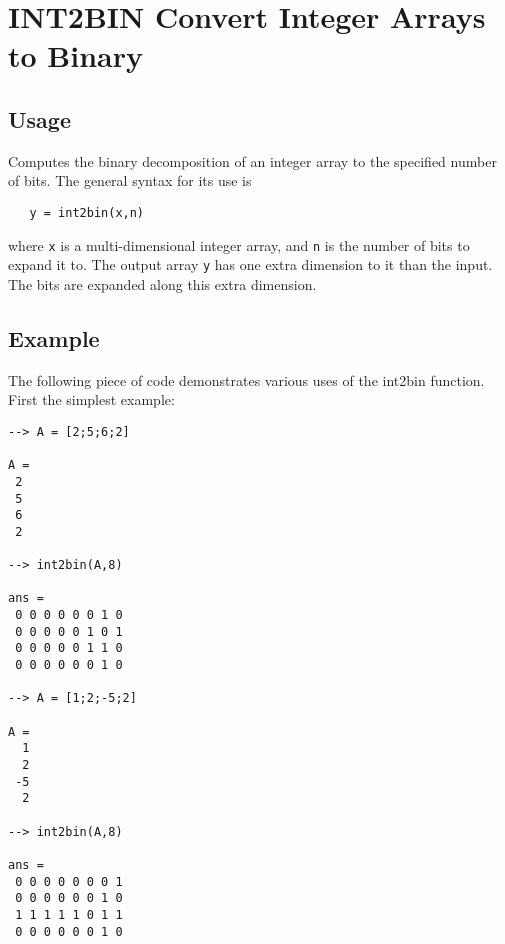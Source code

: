 \section{INT2BIN Convert Integer Arrays to Binary}

\subsection{Usage}

Computes the binary decomposition of an integer array to the specified
number of bits.  The general syntax for its use is
\begin{verbatim}
   y = int2bin(x,n)
\end{verbatim}
where \verb|x| is a multi-dimensional integer array, and \verb|n| is the number
of bits to expand it to.  The output array \verb|y| has one extra dimension
to it than the input.  The bits are expanded along this extra dimension.
\subsection{Example}

The following piece of code demonstrates various uses of the int2bin
function.  First the simplest example:
\begin{verbatim}
--> A = [2;5;6;2]

A = 
 2 
 5 
 6 
 2 

--> int2bin(A,8)

ans = 
 0 0 0 0 0 0 1 0 
 0 0 0 0 0 1 0 1 
 0 0 0 0 0 1 1 0 
 0 0 0 0 0 0 1 0 

--> A = [1;2;-5;2]

A = 
  1 
  2 
 -5 
  2 

--> int2bin(A,8)

ans = 
 0 0 0 0 0 0 0 1 
 0 0 0 0 0 0 1 0 
 1 1 1 1 1 0 1 1 
 0 0 0 0 0 0 1 0 
\end{verbatim}
